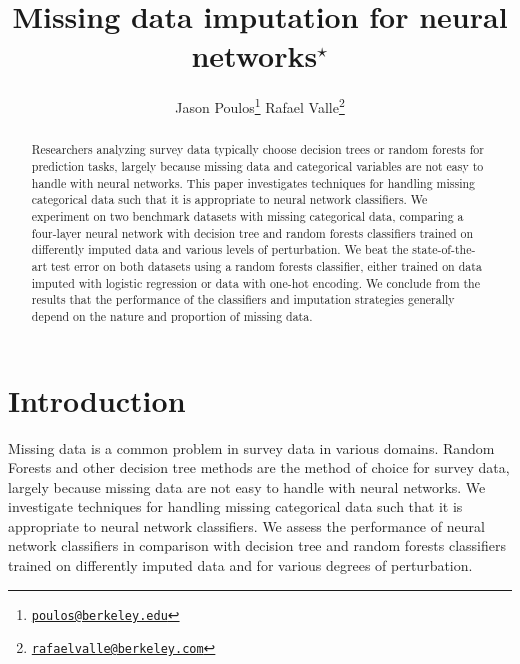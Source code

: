 \documentclass[10pt,twocolumn,letterpaper]{article}
\begin{document}
\title{Missing data imputation for neural networks$^\star$}

\author{
    Jason Poulos\thanks{\href{mailto:poulos@berkeley.edu}{\nolinkurl{poulos@berkeley.edu}}}
    \hspace{10mm}
    Rafael Valle\thanks{\href{mailto:rafaelvalle@berkeley.com}{\nolinkurl{rafaelvalle@berkeley.com}}}
    \vspace{15mm}
}

\maketitle

\begin{abstract}
Researchers analyzing survey data typically choose decision trees or random forests for prediction tasks, largely because missing data and categorical variables are not easy to handle with neural networks. This paper investigates techniques for handling missing categorical data such that it is appropriate to neural network classifiers. We experiment on two benchmark datasets with missing categorical data, comparing a four-layer neural network with decision tree and random forests classifiers trained on differently imputed data and various levels of perturbation. We beat the state-of-the-art test error on both datasets using a random forests classifier, either trained on data imputed with logistic regression or data with one-hot encoding. We conclude from the results that the performance of the classifiers and imputation strategies generally depend on the nature and proportion of missing data. 
\end{abstract}



\section{Introduction} \label{section:Intro}

Missing data is a common problem in survey data in various domains. Random Forests and other decision tree methods are the method of choice for survey data, largely because missing data are not easy to handle with neural networks. We investigate techniques for handling missing categorical data such that it is appropriate to neural network classifiers. We assess the performance of neural network classifiers in comparison with decision tree and random forests classifiers trained on differently imputed data and for various degrees of perturbation.
\end{document}
